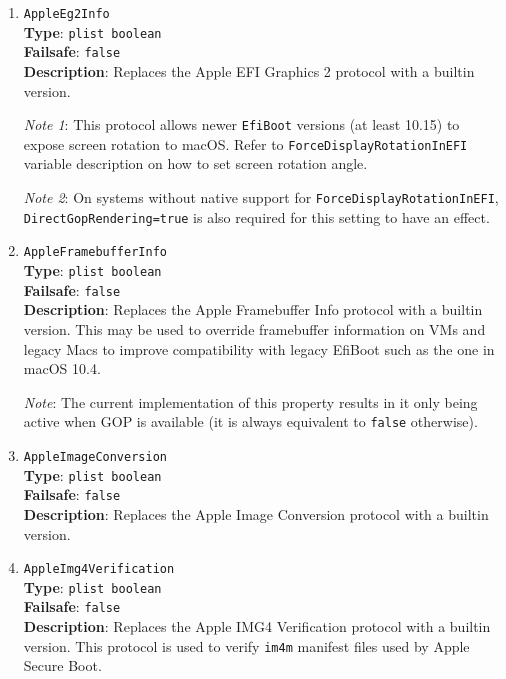 \documentclass[]{article}
\begin{document}
\begin{enumerate}
\item
  \texttt{AppleEg2Info}\\
  \textbf{Type}: \texttt{plist\ boolean}\\
  \textbf{Failsafe}: \texttt{false}\\
  \textbf{Description}: Replaces the Apple EFI Graphics 2 protocol with a builtin
  version.

  \emph{Note 1}: This protocol allows newer \texttt{EfiBoot} versions (at least 10.15)
  to expose screen rotation to macOS. Refer to \texttt{ForceDisplayRotationInEFI}
  variable description on how to set screen rotation angle.

  \emph{Note 2}: On systems without native
  support for \texttt{ForceDisplayRotationInEFI}, \texttt{DirectGopRendering=true}
  is also required for this setting to have an effect.

\item
  \texttt{AppleFramebufferInfo}\\
  \textbf{Type}: \texttt{plist\ boolean}\\
  \textbf{Failsafe}: \texttt{false}\\
  \textbf{Description}: Replaces the Apple Framebuffer Info protocol with a builtin
  version. This may be used to override framebuffer information on VMs and legacy Macs
  to improve compatibility with legacy EfiBoot such as the one in macOS 10.4.

  \emph{Note}: The current implementation of this property results in it only being
  active when GOP is available (it is always equivalent to \texttt{false} otherwise).

\item
  \texttt{AppleImageConversion}\\
  \textbf{Type}: \texttt{plist\ boolean}\\
  \textbf{Failsafe}: \texttt{false}\\
  \textbf{Description}: Replaces the Apple Image Conversion protocol with a builtin
  version.

\item
  \texttt{AppleImg4Verification}\\
  \textbf{Type}: \texttt{plist\ boolean}\\
  \textbf{Failsafe}: \texttt{false}\\
  \textbf{Description}: Replaces the Apple IMG4 Verification protocol with a builtin
  version. This protocol is used to verify \texttt{im4m} manifest files used by
  Apple Secure Boot.


\end{enumerate}
\end{document}
